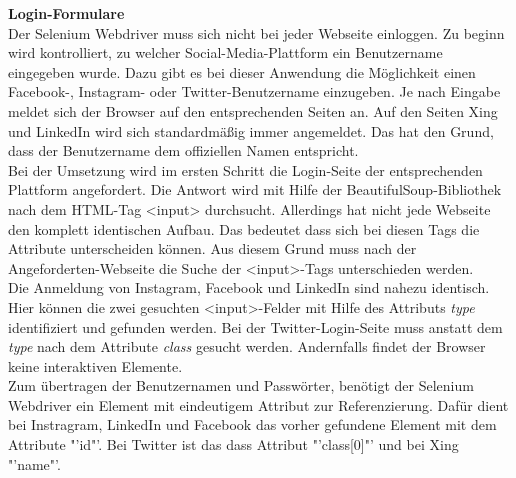 			\textbf{Login-Formulare}\\
			Der Selenium Webdriver muss sich nicht bei jeder Webseite einloggen. Zu beginn wird kontrolliert, zu welcher Social-Media-Plattform ein Benutzername eingegeben wurde. Dazu gibt es bei dieser Anwendung die Möglichkeit einen Facebook-, Instagram- oder Twitter-Benutzername einzugeben. Je nach Eingabe meldet sich der Browser auf den entsprechenden Seiten an. Auf den Seiten Xing und LinkedIn wird sich standardmäßig immer angemeldet. Das hat den Grund, dass der Benutzername dem offiziellen Namen entspricht.\\
			Bei der Umsetzung wird im ersten Schritt die Login-Seite der entsprechenden Plattform angefordert. Die Antwort wird mit Hilfe der BeautifulSoup-Bibliothek nach dem HTML-Tag <input> durchsucht. Allerdings hat nicht jede Webseite den komplett identischen Aufbau. Das bedeutet dass sich bei diesen Tags die Attribute unterscheiden können. Aus diesem Grund muss nach der Angeforderten-Webseite die Suche der <input>-Tags unterschieden werden.\\
			Die Anmeldung von Instagram, Facebook und LinkedIn sind nahezu identisch. Hier können die zwei gesuchten <input>-Felder mit Hilfe des Attributs \textit{type} identifiziert und gefunden werden. Bei der Twitter-Login-Seite muss anstatt dem \textit{type} nach dem Attribute \textit{class} gesucht werden. Andernfalls findet der Browser keine interaktiven Elemente.\\
			Zum übertragen der Benutzernamen und Passwörter, benötigt der Selenium Webdriver ein Element mit eindeutigem Attribut zur Referenzierung. Dafür dient bei Instragram, LinkedIn und Facebook das vorher gefundene Element mit dem Attribute "'id"'. Bei Twitter ist das dass Attribut "'class[0]"' und bei Xing "'name"'.
			 
